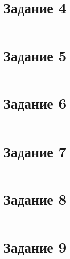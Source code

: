 \begin{lstlisting}
\end{lstlisting}


\section{Задание 4}

\begin{lstlisting}
\end{lstlisting}


\section{Задание 5}

\begin{lstlisting}
\end{lstlisting}


\section{Задание 6}

\begin{lstlisting}
\end{lstlisting}


\section{Задание 7}

\begin{lstlisting}
\end{lstlisting}


\section{Задание 8}

\begin{lstlisting}
\end{lstlisting}


\section{Задание 9}

\begin{lstlisting}
\end{lstlisting}